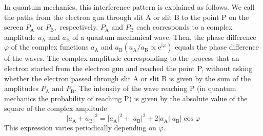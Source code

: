 In quantum mechanics, this interference pattern is explained as follows. We call the paths from the electron gun through slit A or slit B to the point P on the screen $P _ { \mathrm { A } }$ or $P _ { \mathrm { B } } ,$ respectively. $P _ { \mathrm { A } }$ and $P _ { \mathrm { B } }$ each corresponds to a complex amplitude $a _ { \mathrm { A } }$ and $a _ { \mathrm { B } }$ of a quantum mechanical wave. Then, the phase difference $\varphi$ of the complex functions $a _ { \mathrm { A } }$ and $a _ { \mathrm { B } } \left( a _ { \mathrm { A } } / a _ { \mathrm { B } } \propto \mathrm { e } ^ { \mathrm { i } \varphi } \right)$ equals the phase difference of the waves. The complex amplitude corresponding to the process that an electron started from the electron gun and reached the point P, without asking whether the electron passed through slit A or slit B is given by the sum of the amplitudes $P _ { \mathrm { A } }$ and $P _ { \mathrm { B } }$. The intensity of the wave reaching P (in quantum mechanics the probability of reaching P) is given by the absolute value of the square of the complex amplitude
\[\left| a _ { \mathrm { A } } + a _ { \mathrm { B } } \right| ^ { 2 } = \left| a _ { \mathrm { A } } \right| ^ { 2 } + \left| a _ { \mathrm { B } } \right| ^ { 2 } + 2 \left| a _ { \mathrm { A } } \right| \left| a _ { \mathrm { B } } \right| \cos \varphi\]
This expression varies periodically depending on $\varphi$. 


































































































